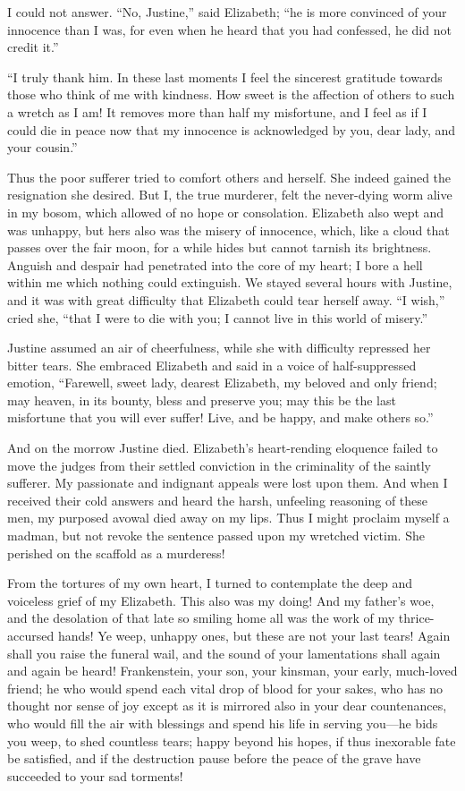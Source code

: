 \documentclass[12pt,openright]{book}
\begin{document}
I could not answer. “No, Justine,” said Elizabeth; “he is more convinced of your innocence than I was, for even when he heard that you had confessed, he did not credit it.”

“I truly thank him. In these last moments I feel the sincerest gratitude towards those who think of me with kindness. How sweet is the affection of others to such a wretch as I am! It removes more than half my misfortune, and I feel as if I could die in peace now that my innocence is acknowledged by you, dear lady, and your cousin.”

Thus the poor sufferer tried to comfort others and herself. She indeed gained the resignation she desired. But I, the true murderer, felt the never-dying worm alive in my bosom, which allowed of no hope or consolation. Elizabeth also wept and was unhappy, but hers also was the misery of innocence, which, like a cloud that passes over the fair moon, for a while hides but cannot tarnish its brightness. Anguish and despair had penetrated into the core of my heart; I bore a hell within me which nothing could extinguish. We stayed several hours with Justine, and it was with great difficulty that Elizabeth could tear herself away. “I wish,” cried she, “that I were to die with you; I cannot live in this world of misery.”

Justine assumed an air of cheerfulness, while she with difficulty repressed her bitter tears. She embraced Elizabeth and said in a voice of half-suppressed emotion, “Farewell, sweet lady, dearest Elizabeth, my beloved and only friend; may heaven, in its bounty, bless and preserve you; may this be the last misfortune that you will ever suffer! Live, and be happy, and make others so.”

And on the morrow Justine died. Elizabeth’s heart-rending eloquence failed to move the judges from their settled conviction in the criminality of the saintly sufferer. My passionate and indignant appeals were lost upon them. And when I received their cold answers and heard the harsh, unfeeling reasoning of these men, my purposed avowal died away on my lips. Thus I might proclaim myself a madman, but not revoke the sentence passed upon my wretched victim. She perished on the scaffold as a murderess!

From the tortures of my own heart, I turned to contemplate the deep and voiceless grief of my Elizabeth. This also was my doing! And my father’s woe, and the desolation of that late so smiling home all was the work of my thrice-accursed hands! Ye weep, unhappy ones, but these are not your last tears! Again shall you raise the funeral wail, and the sound of your lamentations shall again and again be heard! Frankenstein, your son, your kinsman, your early, much-loved friend; he who would spend each vital drop of blood for your sakes, who has no thought nor sense of joy except as it is mirrored also in your dear countenances, who would fill the air with blessings and spend his life in serving you—he bids you weep, to shed countless tears; happy beyond his hopes, if thus inexorable fate be satisfied, and if the destruction pause before the peace of the grave have succeeded to your sad torments!
\end{document}
